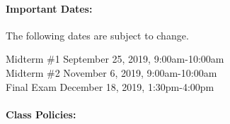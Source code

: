 \documentclass[11pt]{article}
\begin{document}
\paragraph{Important Dates:}

The following dates are subject to change.
\begin{center} \begin{minipage}{3.8in}
\begin{flushleft}
Midterm \#1      \dotfill September 25, 2019, 9:00am-10:00am\\
Midterm \#2      \dotfill November 6, 2019, 9:00am-10:00am  \\
Final Exam      \dotfill December 18, 2019, 1:30pm-4:00pm\\
\end{flushleft}
\end{minipage}
\end{center}

\paragraph{Class Policies:}  
\end{document}
